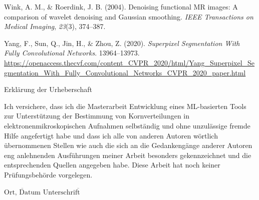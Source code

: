 \documentclass[
  12pt,
  openany]{book}
\newlength{\cslhangindent}
\newlength{\cslentryspacingunit} %
\newenvironment{CSLReferences}[2] %
 {%
  \setlength{\parindent}{0pt}
  \ifodd #1
  \let\oldpar\par
  \def\par{\hangindent=\cslhangindent\oldpar}
  \fi
  \setlength{\parskip}{#2\cslentryspacingunit}
 }%
 {}
\begin{document}
\begin{CSLReferences}{1}{0}
\leavevmode{}%
Wink, A. M., \& Roerdink, J. B. (2004). Denoising functional {MR} images: A comparison of wavelet denoising and {Gaussian} smoothing. \emph{IEEE Transactions on Medical Imaging}, \emph{23}(3), 374--387.

\leavevmode{}%
Yang, F., Sun, Q., Jin, H., \& Zhou, Z. (2020). \emph{Superpixel {Segmentation With Fully Convolutional Networks}}. 13964--13973. \url{https://openaccess.thecvf.com/content_CVPR_2020/html/Yang_Superpixel_Segmentation_With_Fully_Convolutional_Networks_CVPR_2020_paper.html}

\end{CSLReferences}

\newpage{}
{\Large Erklärung der Urheberschaft}

Ich versichere, dass ich die Masterarbeit \glqq{}Entwicklung eines ML-basierten Tools zur Unterstützung der Bestimmung von Kornverteilungen in elektronenmikroskopischen Aufnahmen\grqq{} selbständig und ohne
unzulässige fremde Hilfe angefertigt habe und dass ich alle von anderen Autoren wörtlich
übernommenen Stellen wie auch die sich an die Gedankengänge anderer Autoren eng
anlehnenden Ausführungen meiner Arbeit besonders gekennzeichnet und die
entsprechenden Quellen angegeben habe.
Diese Arbeit hat noch keiner Prüfungsbehörde vorgelegen.

\vspace{4cm}

\hspace{2cm} $\overline{\text{Ort, Datum}}$ \hfill $\overline{\text{Unterschrift} \hspace{2cm}}$
\end{document}

